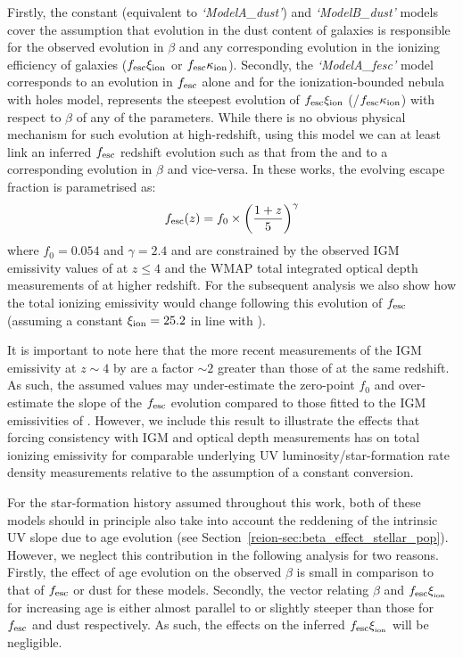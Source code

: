 Firstly, the constant (equivalent to \emph{`ModelA\_dust'}) and \emph{`ModelB\_dust'} models cover the assumption that evolution in the dust content of galaxies is responsible for the observed evolution in $\beta$ and any corresponding evolution in the ionizing efficiency of galaxies ($f_{\rm{esc}}\xi_{\rm{ion}}$ or $f_{\rm{esc}}\kappa_{\rm{ion}}$). Secondly, the \emph{`ModelA\_fesc'} model corresponds to an evolution in $f_{\rm{esc}}$ alone and for the ionization-bounded nebula with holes model, represents the steepest evolution of $f_{\rm{esc}}\xi_{\rm{ion}}$ (/$f_{\rm{esc}}\kappa_{\rm{ion}}$) with respect to $\beta$ of any of the parameters. While there is no obvious physical mechanism for such evolution at high-redshift, using this model we can at least link an inferred $f_{\rm{esc}}$ redshift evolution such as that from the \citet{Kuhlen:2012ka} and  to a corresponding evolution in $\beta$ and vice-versa. In these works, the evolving escape fraction is parametrised as:
\begin{equation}\label{eq	:fesc_z_r13}
f_{\rm{esc}}(z) = f_{0} \times \left ( \frac{1 + z}{5} \right )^{\gamma }
\end{equation}
where $f_{0} = 0.054$ and $\gamma = 2.4$  and are constrained by the observed IGM emissivity values of \citet{FaucherGiguere:2008jc} at $z \leq 4$ and the WMAP total integrated optical depth measurements of \citet{Hinshaw:2013dd} at higher redshift. For the subsequent analysis we also show how the total ionizing emissivity would change following this evolution of $f_{\rm{esc}}$ (assuming a constant $\xi_{\rm{ion}} = 25.2$ in line with ).

It is important to note here that the more recent measurements of the IGM emissivity at $z\sim4$ by \citet{Becker:2013hc} are a factor $\sim 2$ greater than those of \citet{FaucherGiguere:2008jc} at the same redshift. As such, the assumed values may under-estimate the zero-point $f_{0}$ and over-estimate the slope of the $f_{\rm{esc}}$ evolution compared to those fitted to the IGM emissivities of \citet{Becker:2013hc}. However, we include this result to illustrate the effects that forcing consistency with IGM and optical depth measurements has on total ionizing emissivity for comparable underlying UV luminosity/star-formation rate density measurements relative to the assumption of a constant conversion.

 For the star-formation history assumed throughout this work, both of these models should in principle also take into account the reddening of the intrinsic UV slope due to age evolution (see Section~\ref{reion-sec:beta_effect_stellar_pop}). However, we neglect this contribution  in the following analysis for two reasons. Firstly, the effect of age evolution on the observed $\beta$ is small in comparison to that of $f_{\rm{esc}}$ or dust for these models. Secondly, the vector relating $\beta$ and $f_{\rm{esc}}\xi_{\rm_{ion}}$ for increasing age is either almost parallel to or slightly steeper than those for $f_{\rm{esc}}$ and dust respectively. As such, the effects on the inferred $f_{\rm{esc}}\xi_{\rm_{ion}}$ will be negligible.

